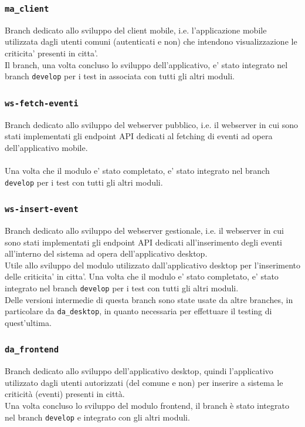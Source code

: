 \documentclass{article}
\begin{document}
\subsubsection{\texttt{ma\_client}}
Branch dedicato allo sviluppo del client mobile, i.e. l'applicazione mobile utilizzata dagli utenti comuni (autenticati e non) che intendono visualizzazione le criticita' presenti in citta'.\\
Il branch, una volta concluso lo sviluppo dell'applicativo, e' stato integrato nel branch \texttt{develop} per i test in associata con tutti gli altri moduli.

\subsubsection{\texttt{ws-fetch-eventi}}
Branch dedicato allo sviluppo del webserver pubblico, i.e. il webserver in cui sono stati implementati gli endpoint API dedicati al fetching di eventi ad opera dell'applicativo mobile.\\
\\
Una volta che il modulo e' stato completato, e' stato integrato nel branch \texttt{develop} per i test con tutti gli altri moduli.


\subsubsection{\texttt{ws-insert-event}}
Branch dedicato allo sviluppo del webserver gestionale, i.e. il webserver in cui sono stati implementati gli endpoint API dedicati all'inserimento degli eventi all'interno del sistema ad opera dell'applicativo desktop. \\
Utile allo sviluppo del modulo utilizzato dall'applicativo desktop per l'inserimento delle criticita' in citta'.
Una volta che il modulo e' stato completato, e' stato integrato nel branch \texttt{develop} per i test con tutti gli altri moduli.\\
Delle versioni intermedie di questa branch sono state usate da altre branches, in particolare da \texttt{da\_desktop}, in quanto necessaria per effettuare il testing di quest'ultima.


\subsubsection{\texttt{da\_frontend}}
Branch dedicato allo sviluppo dell'applicativo desktop, quindi l'applicativo utilizzato dagli utenti autorizzati (del comune e non) per inserire a sistema le criticità (eventi) presenti in città.\\
Una volta concluso lo sviluppo del modulo frontend, il branch è stato integrato nel branch \texttt{develop} e integrato con gli altri moduli.
\end{document}
